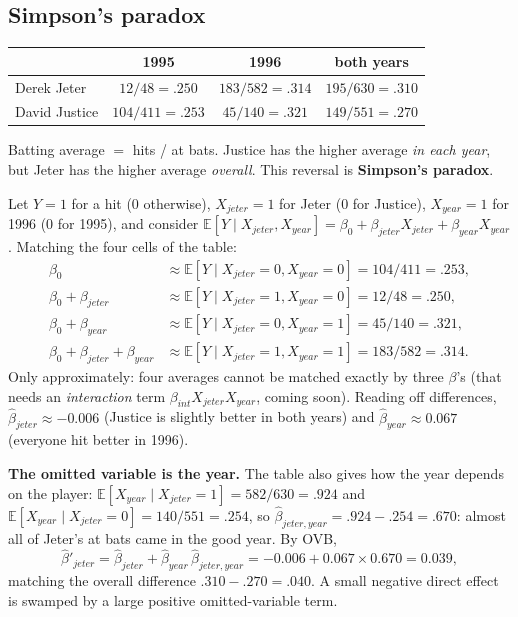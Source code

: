 \documentclass[11pt]{article}
\newcommand{\E}{\mathbb{E}}
\newcommand{\given}{\mid}
\begin{document}
\subsection{Simpson's paradox}
\begin{center}
\begin{tabular}{@{}lccc@{}}
\toprule
 & 1995 & 1996 & both years\\\midrule
Derek Jeter & $12/48=.250$ & $183/582=.314$ & $195/630=.310$\\
David Justice & $104/411=.253$ & $45/140=.321$ & $149/551=.270$\\
\bottomrule
\end{tabular}
\end{center}
Batting average $=$ hits / at bats. Justice has the higher average \emph{in each year}, but Jeter has the higher average \emph{overall}.
This reversal is \textbf{Simpson's paradox}.

\begin{examplebox}[title={Question (10/14): explain it with omitted-variable bias}]
Let $Y=1$ for a hit (0 otherwise), $X_{jeter}=1$ for Jeter (0 for Justice), $X_{year}=1$ for 1996 (0 for 1995), and consider
$\E[Y\given X_{jeter},X_{year}]=\beta_0+\beta_{jeter}X_{jeter}+\beta_{year}X_{year}$. Matching the four cells of the table:
\begin{align*}
\beta_0&\approx\E[Y\given X_{jeter}{=}0,X_{year}{=}0]=104/411=.253,\\
\beta_0+\beta_{jeter}&\approx\E[Y\given X_{jeter}{=}1,X_{year}{=}0]=12/48=.250,\\
\beta_0+\beta_{year}&\approx\E[Y\given X_{jeter}{=}0,X_{year}{=}1]=45/140=.321,\\
\beta_0+\beta_{jeter}+\beta_{year}&\approx\E[Y\given X_{jeter}{=}1,X_{year}{=}1]=183/582=.314.
\end{align*}
Only approximately: four averages cannot be matched exactly by three $\beta$'s (that needs an \emph{interaction} term
$\beta_{int}X_{jeter}X_{year}$, coming soon). Reading off differences, $\hat\beta_{jeter}\approx-0.006$ (Justice is slightly better in both
years) and $\hat\beta_{year}\approx0.067$ (everyone hit better in 1996).

\textbf{The omitted variable is the year.} The table also gives how the year depends on the player:
$\E[X_{year}\given X_{jeter}{=}1]=582/630=.924$ and $\E[X_{year}\given X_{jeter}{=}0]=140/551=.254$, so
$\hat\beta_{jeter,year}=.924-.254=.670$: almost all of Jeter's at bats came in the good year. By OVB,
\[
\hat\beta'_{jeter}=\hat\beta_{jeter}+\hat\beta_{year}\,\hat\beta_{jeter,year}=-0.006+0.067\times0.670=0.039,
\]
matching the overall difference $.310-.270=.040$. A small negative direct effect is swamped by a large positive omitted-variable term.
\end{examplebox}
\end{document}

